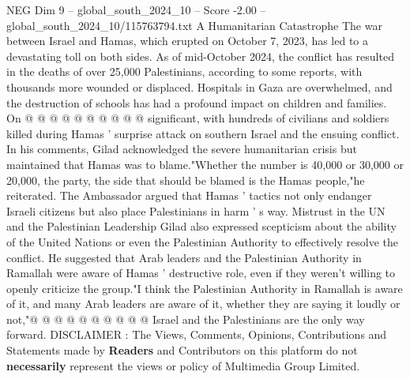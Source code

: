 \begin{textsample}{NEG Dim 9 – global\_south\_2024\_10 – Score -2.00 – global\_south\_2024\_10/115763794.txt}
A Humanitarian Catastrophe The war between Israel and Hamas, which erupted on October 7, 2023, has led to a devastating toll on both sides.
As of mid-October 2024, the conflict has resulted in the deaths of over 25,000 Palestinians, according to some reports, with thousands more wounded or displaced.
Hospitals in Gaza are overwhelmed, and the destruction of schools has had a profound impact on children and families.
On @ @ @ @ @ @ @ @ @ @ significant, with hundreds of civilians and soldiers killed during Hamas ' surprise attack on southern Israel and the ensuing conflict.
In his comments, Gilad acknowledged the severe humanitarian crisis but maintained that Hamas was to blame."Whether the number is 40,000 or 30,000 or 20,000, the party, the side that should be blamed is the Hamas people,"he reiterated.
The Ambassador argued that Hamas ' tactics not only endanger Israeli citizens but also place Palestinians in harm ' s way.
Mistrust in the UN and the Palestinian Leadership Gilad also expressed scepticism about the ability of the United Nations or even the Palestinian Authority to effectively resolve the conflict.
He suggested that Arab leaders and the Palestinian Authority in Ramallah were aware of Hamas ' destructive role, even if they weren't willing to openly criticize the group."I think the Palestinian Authority in Ramallah is aware of it, and many Arab leaders are aware of it, whether they are saying it loudly or not,"@ @ @ @ @ @ @ @ @ @ Israel and the Palestinians are the only way forward.
DISCLAIMER : The Views, Comments, Opinions, Contributions and Statements made by \textbf{Readers} and Contributors on this platform do not \textbf{necessarily} represent the views or policy of Multimedia Group Limited.

\end{textsample}
